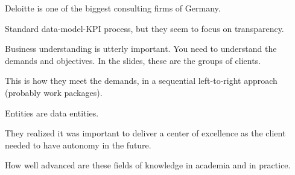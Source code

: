 
\nextslides[slide=5]

Deloitte is one of the biggest consulting firms of Germany.

\nextslides

Standard data-model-KPI process, but they seem to focus on transparency.

\nextslides[slide=9]

Business understanding is utterly important. You need to understand the demands and objectives. In the slides, these are the groups of clients.

\nextslides

This is how they meet the demands, in a sequential left-to-right approach (probably work packages).

\nextslides

Entities are data entities.

\nextslides[slide=14,until=17] 

They realized it was important to deliver a center of excellence as the client needed to have autonomy in the future.

\nextslides[slide=19,until=22]

\nextslides[slide=28]

How well advanced are these fields of knowledge in academia and in practice.

